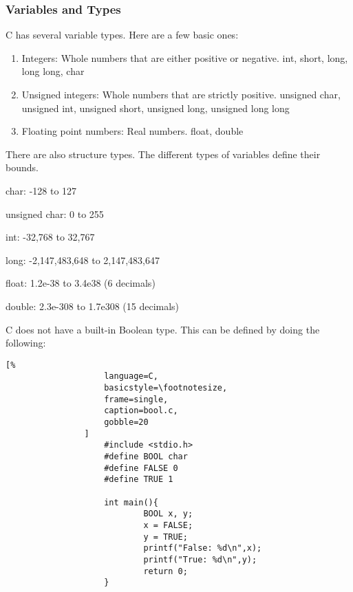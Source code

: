 \documentclass[crop=false,class=article,oneside]{standalone}
\begin{document}
        \subsubsection{Variables and Types}
            C has several variable types. Here are a few basic ones:
            \begin{enumerate}
                \item Integers: Whole numbers that are either
                    positive or negative. int, short, long,
                    long long, char
                \item Unsigned integers: Whole numbers that are
                    strictly positive. unsigned char,
                    unsigned int, unsigned short, unsigned long,
                    unsigned long long
                \item Floating point numbers: Real numbers.
                    float, double
            \end{enumerate}
            There are also structure types. The different types of
            variables define their bounds.
            \begin{itemize}
                \begin{multicols}{2}
                    \item char: -128 to 127
                    \item unsigned char: 0 to 255
                    \item int: -32,768 to 32,767
                    \item long: -2,147,483,648 to 2,147,483,647
                    \item float: 1.2e-38 to 3.4e38 (6 decimals)
                    \item double: 2.3e-308 to 1.7e308 (15 decimals)
                \end{multicols}
            \end{itemize}
            C does not have a built-in Boolean type. This can be
            defined by doing the following:
            \newline
            \begin{minipage}[t]{.48\textwidth}
                \centering
                \begin{lstlisting}[%
                    language=C,
                    basicstyle=\footnotesize,
                    frame=single,
                    caption=bool.c,
                    gobble=20
                ]
                    #include <stdio.h>
                    #define BOOL char
                    #define FALSE 0
                    #define TRUE 1
                    
                    int main(){
                            BOOL x, y;
                            x = FALSE;
                            y = TRUE;
                            printf("False: %d\n",x);
                            printf("True: %d\n",y);
                            return 0;
                    }
                \end{lstlisting}
            \end{minipage}\hfill
\end{document}
